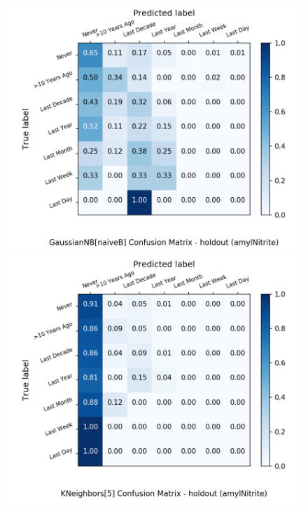 \begin{figure}[H]
\begin{minipage}[b]{0.32\textwidth}
		\includegraphics[width=1.1\textwidth]{Plots/amylNitrite_GaussianNB_naiveB_balance_False_holdout.png}
	\end{minipage}
	\begin{minipage}[b]{0.32\textwidth}
		\includegraphics[width=1.1\textwidth]{Plots/amylNitrite_KNeighbors_5_balance_False_holdout.png}
  \end{minipage}
	\begin{minipage}[b]{0.32\textwidth}

\end{minipage}
\end{figure}
